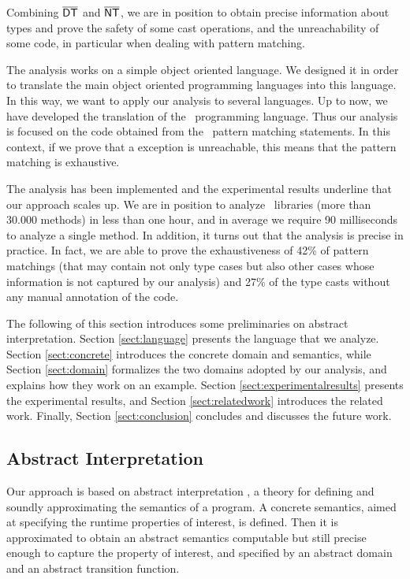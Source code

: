 \documentclass{llncs}
\begin{document}
Combining $\mathsf{\overline{DT}}$ and $\mathsf{\overline{NT}}$, we are in position to obtain precise information about types and prove the safety of some cast operations, and the unreachability of some code, in particular when dealing with pattern matching.

The analysis works on a simple object oriented language. We designed it in order to translate the main object oriented programming languages into this language. In this way, we want to apply our analysis to several languages. Up to now, we have developed the translation of the \Scala\ programming language. Thus our analysis is focused on the code obtained from the \Scala\ pattern matching statements. In this context, if we prove that a  exception is unreachable, this means that the pattern matching is exhaustive.

The analysis has been implemented and the experimental results underline that our approach scales up. We are in position to analyze \Scala\ libraries (more than 30.000 methods) in less than one hour, and in average we require 90 milliseconds to analyze a single method. In addition, it turns out that the analysis is precise in practice. In fact, we are able to prove the exhaustiveness of 42\% of pattern matchings (that may contain not only type cases but also other cases whose information is not captured by our analysis) and 27\% of the type casts without any manual annotation of the code.

The following of this section introduces some preliminaries on abstract interpretation. Section \ref{sect:language} presents the language that we analyze. Section \ref{sect:concrete} introduces the concrete domain and semantics, while Section \ref{sect:domain} formalizes the two domains adopted by our analysis, and explains how they work on an example. Section \ref{sect:experimentalresults} presents the experimental results, and Section \ref{sect:relatedwork} introduces the related work. Finally, Section \ref{sect:conclusion} concludes and discusses the future work.

\subsection{Abstract Interpretation}
Our approach is based on abstract interpretation \cite{CC77,CC79}, a theory for defining and soundly approximating the semantics of a program. A concrete semantics, aimed at specifying the runtime properties of interest, is defined. Then it is approximated to obtain an abstract semantics computable but still precise enough to capture the property of interest, and specified by an abstract domain and an abstract transition function.
\end{document}
